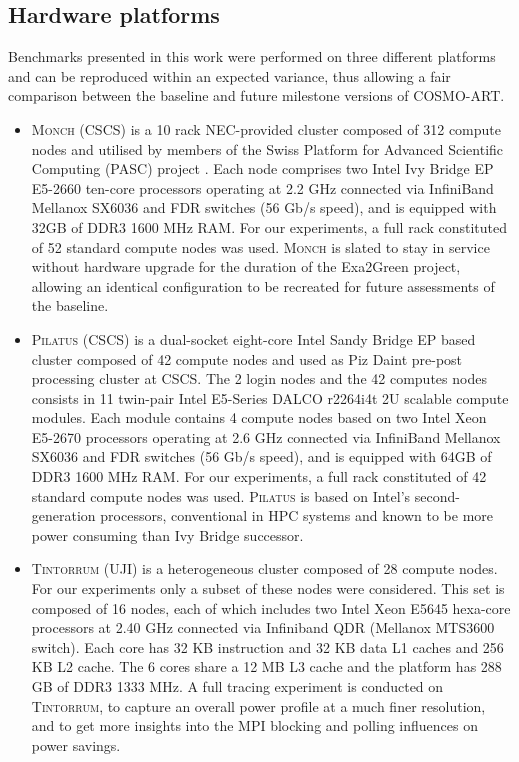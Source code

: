 \subsection{Hardware platforms}
\label{subsec:3.1}

Benchmarks presented  in this work  were performed on  three different
platforms  and can  be reproduced  within an  expected  variance, thus
allowing a  fair comparison between the baseline  and future milestone
versions of COSMO-ART.

\begin{itemize}
\item \textsc{Monch (CSCS)} is a 10 rack NEC-provided cluster composed
  of 312 compute  nodes and utilised by members  of the Swiss Platform
  for Advanced Scientific  Computing (PASC) project \citep{PASC}. Each
  node comprises  two Intel Ivy Bridge EP  E5-2660 ten-core processors
  operating at  2.2 GHz connected  via InfiniBand Mellanox  SX6036 and
  FDR switches (56 Gb/s speed), and is equipped with 32GB of DDR3 1600
  MHz  RAM.   For our  experiments,  a  full  rack constituted  of  52
  standard compute  nodes was used.  \textsc{Monch} is  slated to stay
  in  service  without  hardware  upgrade  for  the  duration  of  the
  Exa2Green  project,  allowing   an  identical  configuration  to  be
  recreated for future assessments of the baseline.\\

\item \textsc{Pilatus (CSCS)} is  a dual-socket eight-core Intel Sandy
  Bridge EP based cluster composed of 42 compute nodes and used as Piz
  Daint pre-post  processing cluster at  CSCS.  The 2 login  nodes and
  the 42 computes nodes consists in 11 twin-pair Intel E5-Series DALCO
  r2264i4t 2U scalable compute modules. Each module contains 4 compute
  nodes based  on two Intel  Xeon E5-2670 processors operating  at 2.6
  GHz connected  via InfiniBand Mellanox  SX6036 and FDR  switches (56
  Gb/s speed), and is equipped with 64GB of DDR3 1600 MHz RAM. For our
  experiments, a  full rack constituted  of 42 standard  compute nodes
  was  used. \textsc{Pilatus}  is based  on  Intel's second-generation
  processors, conventional in  HPC systems and known to  be more power
  consuming than Ivy Bridge successor.\\

\item \textsc{Tintorrum (UJI)} is  a heterogeneous cluster composed of
  28 compute nodes.  For our  experiments only a subset of these nodes
  were considered.   This set is composed  of 16 nodes,  each of which
  includes  two Intel  Xeon  E5645 hexa-core  processors  at 2.40  GHz
  connected via  Infiniband QDR (Mellanox MTS3600  switch).  Each core
  has  32 KB  instruction  and 32  KB data  L1  caches and  256 KB  L2
  cache. The 6 cores  share a 12 MB L3 cache and  the platform has 288
  GB  of DDR3 1333  MHz.  A  full tracing  experiment is  conducted on
  \textsc{Tintorrum}, to  capture an overall  power profile at  a much
  finer resolution, and to get more insights into the MPI blocking and
  polling influences on power savings.
\end{itemize}

